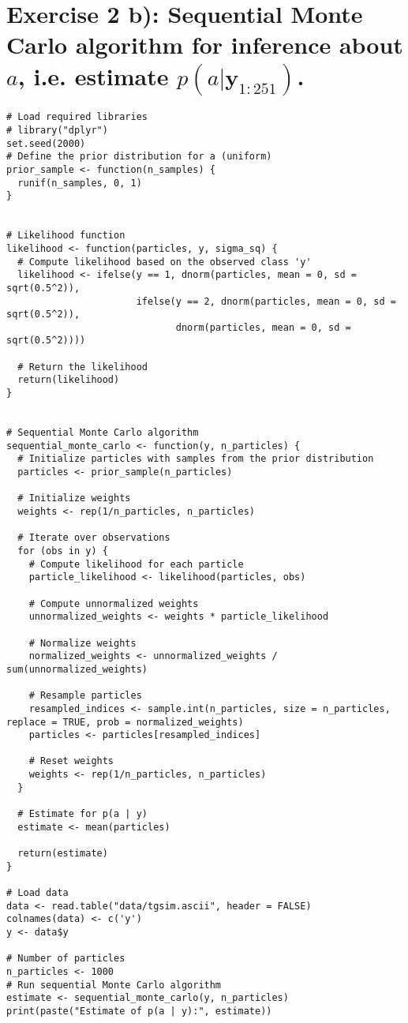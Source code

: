 \section*{Exercise 2 b): Sequential Monte Carlo algorithm for inference about $a$, i.e.
estimate $p(a | \boldsymbol{y}_{1:251})$.}
\begin{tcolorbox}[colback=white!95!black,colframe=white!50!black, breakable]
\begin{lstlisting}[caption={Exercise 2b}, label={lst:MC_2b}]
# Load required libraries
# library("dplyr")
set.seed(2000)
# Define the prior distribution for a (uniform)
prior_sample <- function(n_samples) {
  runif(n_samples, 0, 1)
}


# Likelihood function
likelihood <- function(particles, y, sigma_sq) {
  # Compute likelihood based on the observed class 'y'
  likelihood <- ifelse(y == 1, dnorm(particles, mean = 0, sd = sqrt(0.5^2)),
                       ifelse(y == 2, dnorm(particles, mean = 0, sd = sqrt(0.5^2)),
                              dnorm(particles, mean = 0, sd = sqrt(0.5^2))))
  
  # Return the likelihood
  return(likelihood)
}


# Sequential Monte Carlo algorithm
sequential_monte_carlo <- function(y, n_particles) {
  # Initialize particles with samples from the prior distribution
  particles <- prior_sample(n_particles)
  
  # Initialize weights
  weights <- rep(1/n_particles, n_particles)
  
  # Iterate over observations
  for (obs in y) {
    # Compute likelihood for each particle
    particle_likelihood <- likelihood(particles, obs)
    
    # Compute unnormalized weights
    unnormalized_weights <- weights * particle_likelihood
    
    # Normalize weights
    normalized_weights <- unnormalized_weights / sum(unnormalized_weights)
    
    # Resample particles
    resampled_indices <- sample.int(n_particles, size = n_particles, replace = TRUE, prob = normalized_weights)
    particles <- particles[resampled_indices]
    
    # Reset weights
    weights <- rep(1/n_particles, n_particles)
  }
  
  # Estimate for p(a | y)
  estimate <- mean(particles)
  
  return(estimate)
}

# Load data
data <- read.table("data/tgsim.ascii", header = FALSE)
colnames(data) <- c('y')
y <- data$y

# Number of particles
n_particles <- 1000
# Run sequential Monte Carlo algorithm
estimate <- sequential_monte_carlo(y, n_particles)
print(paste("Estimate of p(a | y):", estimate))
\end{lstlisting}
\end{tcolorbox}
